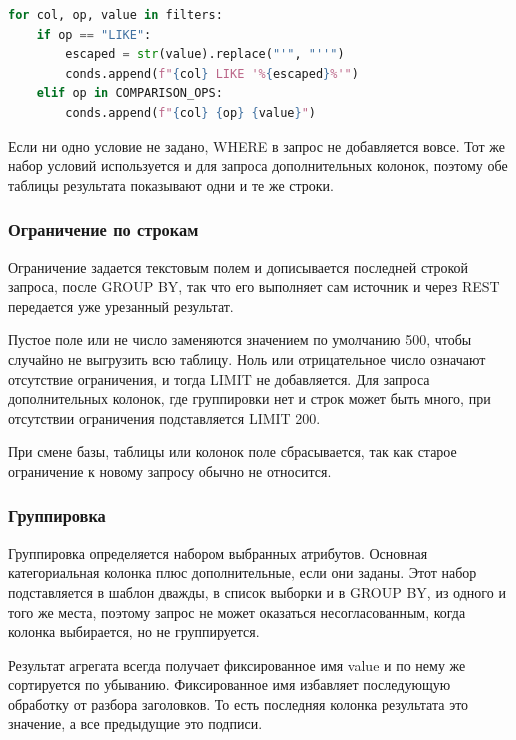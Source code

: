 \documentclass[areasetadvanced]{scrartcl}
\begin{document}
\begin{lstlisting}[language=Python, caption={Сборка условий}, label={lis:where}]
for col, op, value in filters:
    if op == "LIKE":
        escaped = str(value).replace("'", "''")
        conds.append(f"{col} LIKE '%{escaped}%'")
    elif op in COMPARISON_OPS:
        conds.append(f"{col} {op} {value}")
\end{lstlisting}

Если ни одно условие не задано, WHERE в запрос не добавляется вовсе. Тот же набор условий используется и для
запроса дополнительных колонок, поэтому обе таблицы результата показывают одни и те же строки.

        \subsubsection{Ограничение по строкам}
Ограничение задается текстовым полем и дописывается последней строкой запроса, после GROUP BY, так что
его выполняет сам источник и через REST передается уже урезанный результат.

Пустое поле или не число заменяются значением по умолчанию 500, чтобы случайно не выгрузить всю таблицу.
Ноль или отрицательное число означают отсутствие ограничения, и тогда LIMIT не добавляется.
Для запроса дополнительных колонок, где группировки нет и строк может быть много, при отсутствии ограничения
подставляется LIMIT 200.

При смене базы, таблицы или колонок поле сбрасывается, так как старое ограничение к новому запросу
обычно не относится.

        \subsubsection{Группировка}
Группировка определяется набором выбранных атрибутов. 
Основная категориальная колонка плюс дополнительные, если они заданы.
Этот набор подставляется в шаблон дважды, в список выборки и в GROUP BY, из одного и того же места, поэтому запрос
не может оказаться несогласованным, когда колонка выбирается, но не группируется.

Результат агрегата всегда получает фиксированное имя value и по нему же сортируется по убыванию. Фиксированное имя
избавляет последующую обработку от разбора заголовков. То есть последняя колонка результата это значение,
а все предыдущие это подписи.
\end{document}
